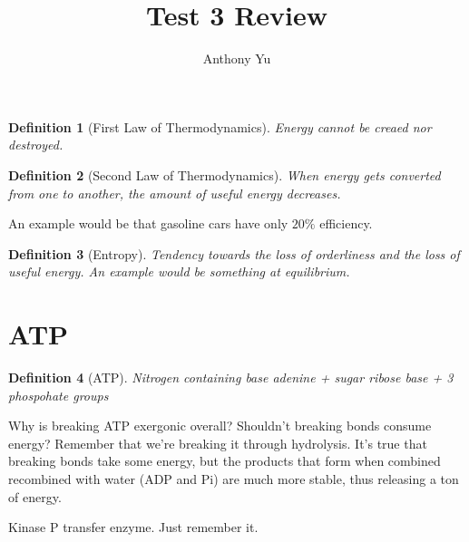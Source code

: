 \documentclass[12pt]{article}
\title{Test 3 Review}
\author{Anthony Yu}
\begin{document}
\newcommand{\problem}[1]{\subsection*{Problem {#1}}}
\newenvironment{enumAlph}{\begin{enumerate}[label=(\alph*)]}{\end{enumerate}}

\makeatletter
\newcommand{\skipitems}[1]{%
\addtocounter{\@enumctr}{#1}%
}
\makeatother

\newcommand{\chunit}[3]{\qty{#1}{{#2}\,\ce{#3}}}
\newcommand{\chuniteval}[3]{\qty[evaluate-expression]{#1}{{#2}\,\ce{#3}}}

\newtheorem{definition}{Definition}

\maketitle

\begin{definition}[First Law of Thermodynamics]
    Energy cannot be creaed nor destroyed. 
\end{definition}
\begin{definition}[Second Law of Thermodynamics]
    When energy gets converted from one to another, the amount of useful energy decreases. 
\end{definition}
An example would be that gasoline cars have only $20\%$ efficiency. 
\begin{definition}[Entropy]
    Tendency towards the loss of orderliness and the loss of useful energy.
    An example would be something at equilibrium. 
\end{definition}

\section{ATP}
\begin{definition}[ATP]
    Nitrogen containing base adenine + sugar ribose base + 3 phospohate groups
\end{definition}
Why is breaking ATP exergonic overall? Shouldn't breaking bonds consume energy?
Remember that we're breaking it through hydrolysis. It's true that
breaking bonds take some energy, but the products that form when combined
recombined with water (ADP and Pi) are much more stable, thus releasing a ton of energy. 

Kinase P transfer enzyme. Just remember it. 
\end{document}
